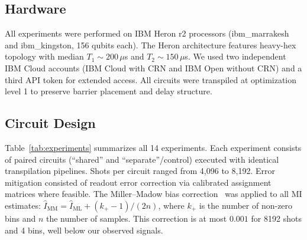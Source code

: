 \documentclass[12pt,a4paper]{article}
\begin{document}
\subsection{Hardware}

All experiments were performed on IBM Heron r2 processors (ibm\_marrakesh and ibm\_kingston, 156 qubits each). The Heron architecture features heavy-hex topology with median $T_1 \sim 200\,\mu$s and $T_2 \sim 150\,\mu$s. We used two independent IBM Cloud accounts (IBM Cloud with CRN and IBM Open without CRN) and a third API token for extended access. All circuits were transpiled at optimization level 1 to preserve barrier placement and delay structure.

\subsection{Circuit Design}

Table~\ref{tab:experiments} summarizes all 14 experiments. Each experiment consists of paired circuits (``shared'' and ``separate''/control) executed with identical transpilation pipelines. Shots per circuit ranged from 4,096 to 8,192. Error mitigation consisted of readout error correction via calibrated assignment matrices where feasible. The Miller--Madow bias correction~\cite{miller1955} was applied to all MI estimates: $\hat{I}_{\text{MM}} = \hat{I}_{\text{ML}} + (k_+ - 1)/(2n)$, where $k_+$ is the number of non-zero bins and $n$ the number of samples. This correction is at most $0.001$ for 8192 shots and 4 bins, well below our observed signals.
\end{document}
